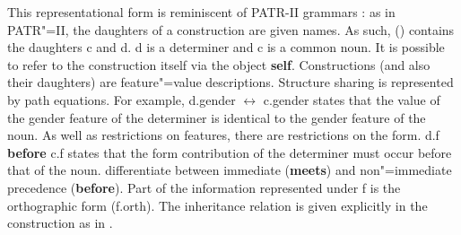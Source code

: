 \eas
\label{CxG-DetNoun}
\zs

\noindent
This representational form is reminiscent of PATR-II grammars \citep*{SURT83a}: as in PATR"=II, the daughters of a construction
are given names. As such, () contains the daughters c and d. d is a determiner and c is a common noun.
It is possible to refer to the construction itself via the object \textbf{self}. Constructions (and also their daughters)
are feature"=value descriptions. Structure sharing is represented by path equations.
For example, d.gender $\leftrightarrow$ c.gender states that the value of the gender feature of the determiner is identical to the
gender feature of the noun. As well as restrictions on features, there are restrictions on the form. d.f \textbf{before} c.f states
that the form contribution of the determiner must occur before that of the noun.
\citet{BC2005a} differentiate between immediate (\textbf{meets}) and non"=immediate precedence (\textbf{before}).
Part of the information represented under f is the orthographic form (f.orth). The inheritance relation is given explicitly
in the construction as in  \citet{KF99a}.

